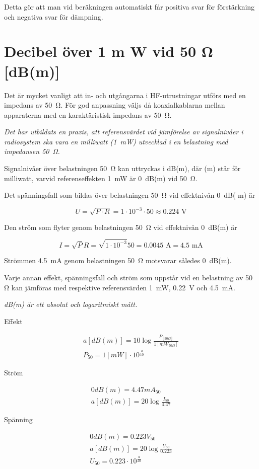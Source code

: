 Detta gör att man vid beräkningen automatiskt får positiva svar för
förstärkning och negativa svar för dämpning.

\section{Decibel över 1 m W vid 50 Ω [dB(m)]}

Det är mycket vanligt att in- och utgångarna i HF-utrustningar utförs
med en impedans av 50~Ω. För god anpassning väljs då koaxialkablarna
mellan apparaterna med en karaktäristisk impedans av 50~Ω.

\emph{Det har utbildats en praxis, att referensvärdet vid jämförelse
	av signalnivåer i radiosystem ska vara en milliwatt (1~mW)
	utvecklad i en belastning med impedansen 50~Ω.}

Signalnivåer över belastningen 50~Ω kan uttryckas i dB(m), där (m)
står för milliwatt, varvid referenseffekten 1~mW är 0~dB(m) vid 50~Ω.

Det spänningsfall som bildas över belastningen 50~Ω vid effektnivån
0~dB( m) är

\[U = \sqrt{P\cdot R} = 1\cdot 10^{-3} \cdot 50 \approx 0.224 \text{ V}\]

Den ström som flyter genom belastningen 50~Ω vid effektnivån 0~dB(m)
är

\[
I = \sqrt{P}{R} = \sqrt{1\cdot 10^{-3}}{50} = 0.0045 \text{ A} = 4.5 \text{ mA}
\]

Strömmen 4.5~mA genom belastningen 50~Ω motsvarar således 0~dB(m).

Varje annan effekt, spänningsfall och ström som uppstår vid en
belastning av 50 Ω kan jämföras med respektive referensvärden 1~mW,
0.22~V och 4.5~mA.

\emph{dB(m) är ett absolut och logaritmiskt mått.}

Effekt

\begin{gather*}
	a [dB(m)] = 10 \log\frac{P_{[50Ω]}}{1[mW_{50Ω}]} \\
	P_{50} = 1 [mW] \cdot 10^{\frac{a}{10}}
\end{gather*}

Ström

\begin{gather*}
	0 dB(m) = 4.47 mA_{50} \\
	a [dB(m)] = 20 \log\frac{I_{50}}{4.47}
\end{gather*}

Spänning

\begin{gather*}
	0 dB(m) = 0.223 V_{50} \\
	a [dB(m)] = 20 \log\frac{U_{50}}{0.223} \\
	U_{50} = 0.223 \cdot 10^{\frac{a}{20}}
\end{gather*}

